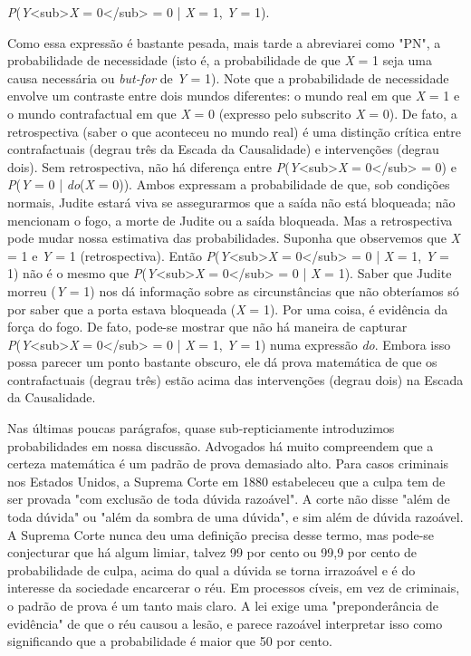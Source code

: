 \documentclass[11pt,a5paper,twoside]{book}
\begin{document}
\textit{P}(\textit{Y}<sub>\textit{X} = 0</sub> = 0 | \textit{X} = 1, \textit{Y} = 1).

Como essa expressão é bastante pesada, mais tarde a abreviarei como "PN", a probabilidade de necessidade (isto é, a probabilidade de que \textit{X} = 1 seja uma causa necessária ou \textit{but-for} de \textit{Y} = 1). Note que a probabilidade de necessidade envolve um contraste entre dois mundos diferentes: o mundo real em que \textit{X} = 1 e o mundo contrafactual em que \textit{X} = 0 (expresso pelo subscrito \textit{X} = 0). De fato, a retrospectiva (saber o que aconteceu no mundo real) é uma distinção crítica entre contrafactuais (degrau três da Escada da Causalidade) e intervenções (degrau dois). Sem retrospectiva, não há diferença entre \textit{P}(\textit{Y}<sub>\textit{X} = 0</sub> = 0) e \textit{P}(\textit{Y} = 0 | \textit{do}(\textit{X} = 0)). Ambos expressam a probabilidade de que, sob condições normais, Judite estará viva se assegurarmos que a saída não está bloqueada; não mencionam o fogo, a morte de Judite ou a saída bloqueada. Mas a retrospectiva pode mudar nossa estimativa das probabilidades. Suponha que observemos que \textit{X} = 1 e \textit{Y} = 1 (retrospectiva). Então \textit{P}(\textit{Y}<sub>\textit{X} = 0</sub> = 0 | \textit{X} = 1, \textit{Y} = 1) não é o mesmo que \textit{P}(\textit{Y}<sub>\textit{X} = 0</sub> = 0 | \textit{X} = 1). Saber que Judite morreu (\textit{Y} = 1) nos dá informação sobre as circunstâncias que não obteríamos só por saber que a porta estava bloqueada (\textit{X} = 1). Por uma coisa, é evidência da força do fogo. De fato, pode-se mostrar que não há maneira de capturar \textit{P}(\textit{Y}<sub>\textit{X} = 0</sub> = 0 | \textit{X} = 1, \textit{Y} = 1) numa expressão \textit{do}. Embora isso possa parecer um ponto bastante obscuro, ele dá prova matemática de que os contrafactuais (degrau três) estão acima das intervenções (degrau dois) na Escada da Causalidade.

Nas últimas poucas parágrafos, quase sub-repticiamente introduzimos probabilidades em nossa discussão. Advogados há muito compreendem que a certeza matemática é um padrão de prova demasiado alto. Para casos criminais nos Estados Unidos, a Suprema Corte em 1880 estabeleceu que a culpa tem de ser provada "com exclusão de toda dúvida razoável". A corte não disse "além de toda dúvida" ou "além da sombra de uma dúvida", e sim além de dúvida razoável. A Suprema Corte nunca deu uma definição precisa desse termo, mas pode-se conjecturar que há algum limiar, talvez 99 por cento ou 99,9 por cento de probabilidade de culpa, acima do qual a dúvida se torna irrazoável e é do interesse da sociedade encarcerar o réu. Em processos cíveis, em vez de criminais, o padrão de prova é um tanto mais claro. A lei exige uma "preponderância de evidência" de que o réu causou a lesão, e parece razoável interpretar isso como significando que a probabilidade é maior que 50 por cento.
\end{document}
